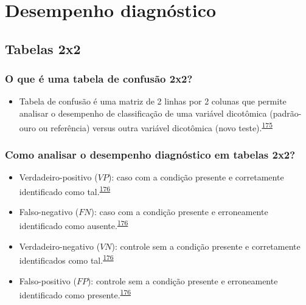 \documentclass[
  a4paper,
]{book}
\providecommand{\tightlist}{%
  \setlength{\itemsep}{0pt}\setlength{\parskip}{0pt}}
\begin{document}
\hypertarget{analise-desempenho-diagnostico}{%
\chapter{\texorpdfstring{\textbf{Desempenho diagnóstico}}{Desempenho diagnóstico}}\label{analise-desempenho-diagnostico}}

\hypertarget{tabelas-2x2}{%
\section{Tabelas 2x2}\label{tabelas-2x2}}

\hypertarget{o-que-uxe9-uma-tabela-de-confusuxe3o-2x2}{%
\subsection{O que é uma tabela de confusão 2x2?}\label{o-que-uxe9-uma-tabela-de-confusuxe3o-2x2}}

\begin{itemize}
\tightlist
\item
  Tabela de confusão é uma matriz de 2 linhas por 2 colunas que permite analisar o desempenho de classificação de uma variável dicotômica (padrão-ouro ou referência) versus outra variável dicotômica (novo teste).\textsuperscript{\protect\hyperlink{ref-steckelberg2004}{175}}
\end{itemize}

\hypertarget{como-analisar-o-desempenho-diagnuxf3stico-em-tabelas-2x2}{%
\subsection{Como analisar o desempenho diagnóstico em tabelas 2x2?}\label{como-analisar-o-desempenho-diagnuxf3stico-em-tabelas-2x2}}

\begin{itemize}
\item
  Verdadeiro-positivo (\(VP\)): caso com a condição presente e corretamente identificado como tal.\textsuperscript{\protect\hyperlink{ref-greenhalgh1997b}{176}}
\item
  Falso-negativo (\(FN\)): caso com a condição presente e erroneamente identificado como ausente.\textsuperscript{\protect\hyperlink{ref-greenhalgh1997b}{176}}
\item
  Verdadeiro-negativo (\(VN\)): controle sem a condição presente e corretamente identificados como tal.\textsuperscript{\protect\hyperlink{ref-greenhalgh1997b}{176}}
\item
  Falso-positivo (\(FP\)): controle sem a condição presente e erroneamente identificado como presente.\textsuperscript{\protect\hyperlink{ref-greenhalgh1997b}{176}}
\end{itemize}
\end{document}
